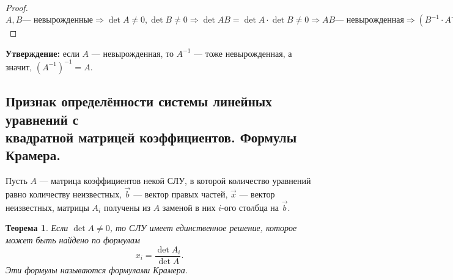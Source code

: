 \documentclass[a4paper, 12pt]{article}
\newtheorem*{que31theorem}{Теорема}
\begin{document}
\begin{proof}
$
A, B \text{--- невырожденные} \Rightarrow \det A \neq 0, \det B \neq 0 \Rightarrow \det AB = \det A \cdot \det B \neq 0 \Rightarrow AB \text{--- невырожденная} \Rightarrow (B^{-1} \cdot A^{-1}) \cdot AB = B^{-1} \cdot A^{-1} \cdot A \cdot B = B^{-1} \cdot E \cdot B = B^{-1} \cdot B = E \Rightarrow (B^{-1} \cdot A^{-1}) = (AB)^{-1}.
$
\end{proof}

\textbf{Утверждение:} если $A$ --- невырожденная, то $A^{-1}$ --- тоже невырожденная, а значит, $(A^{-1})^{-1} = A$.


\subsection{Признак определённости системы линейных уравнений с\\ квадратной матрицей коэффициентов. Формулы Крамера.}
Пусть $A$ — матрица коэффициентов некой СЛУ, в которой количество уравнений равно количеству неизвестных, $\vec b$ — вектор правых частей, $\vec x$ — вектор неизвестных, матрицы $A_i$ получены из $A$ заменой в них $i$-ого столбца на $\vec b$.

\begin{que31theorem}
Если $\det A \not= 0$, то СЛУ имеет единственное решение, которое может быть найдено по формулам 
$$
x_i = \frac{\det A_i}{\det A}.
$$ 
Эти формулы называются формулами Крамера.
\end{que31theorem}
\end{document}
